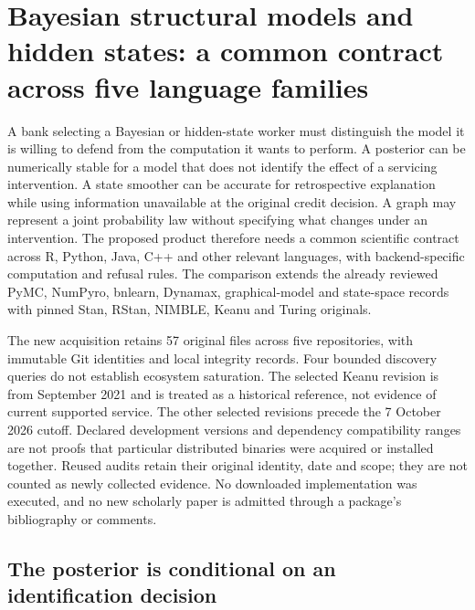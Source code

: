 \section[Bayesian SCM and hidden-state workers]{Bayesian structural models and hidden states: a common contract across five language families}
\label{sec:exec25-bsw}

A bank selecting a Bayesian or hidden-state worker must distinguish the model it is willing to defend from the computation it wants to perform. A posterior can be numerically stable for a model that does not identify the effect of a servicing intervention. A state smoother can be accurate for retrospective explanation while using information unavailable at the original credit decision. A graph may represent a joint probability law without specifying what changes under an intervention. The proposed product therefore needs a common scientific contract across R, Python, Java, C++ and other relevant languages, with backend-specific computation and refusal rules. The comparison extends the already reviewed PyMC, NumPyro, bnlearn, Dynamax, graphical-model and state-space records with pinned Stan, RStan, NIMBLE, Keanu and Turing originals.~\citep{exec23_pymc_sources,exec23_numpyro_sources,exec24_bnlearn_sources,exec19_dynamax_source,exec24_libdai_source,exec24_opengm_source,exec25_bsw_stan,exec25_bsw_rstan,exec25_bsw_nimble,exec25_bsw_keanu,exec25_bsw_turing,exec25_bsw_choice}

The new acquisition retains 57 original files across five repositories, with immutable Git identities and local integrity records. Four bounded discovery queries do not establish ecosystem saturation. The selected Keanu revision is from September 2021 and is treated as a historical reference, not evidence of current supported service. The other selected revisions precede the 7 October 2026 cutoff. Declared development versions and dependency compatibility ranges are not proofs that particular distributed binaries were acquired or installed together. Reused audits retain their original identity, date and scope; they are not counted as newly collected evidence. No downloaded implementation was executed, and no new scholarly paper is admitted through a package's bibliography or comments.~\citep{exec25_bsw_choice}

\subsection{The posterior is conditional on an identification decision}


